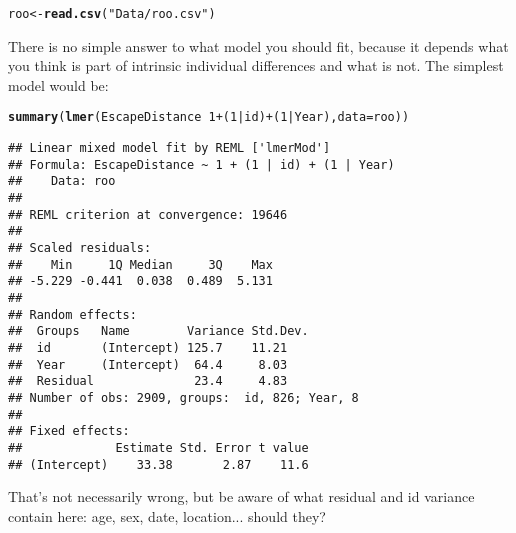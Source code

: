 \documentclass[12pt,a4paper]{scrartcl}\usepackage[]{graphicx}\usepackage[]{color}
\makeatletter
\newcommand{\hlnum}[1]{\textcolor[rgb]{0.686,0.059,0.569}{#1}}%
\newcommand{\hlstr}[1]{\textcolor[rgb]{0.192,0.494,0.8}{#1}}%
\newcommand{\hlopt}[1]{\textcolor[rgb]{0,0,0}{#1}}%
\newcommand{\hlstd}[1]{\textcolor[rgb]{0.345,0.345,0.345}{#1}}%
\newcommand{\hlkwb}[1]{\textcolor[rgb]{0.69,0.353,0.396}{#1}}%
\newcommand{\hlkwc}[1]{\textcolor[rgb]{0.333,0.667,0.333}{#1}}%
\newcommand{\hlkwd}[1]{\textcolor[rgb]{0.737,0.353,0.396}{\textbf{#1}}}%
\newenvironment{kframe}{%
 \def\at@end@of@kframe{}%
 \ifinner\ifhmode%
  \def\at@end@of@kframe{\end{minipage}}%
  \begin{minipage}{\columnwidth}%
 \fi\fi%
 \def\FrameCommand##1{\hskip\@totalleftmargin \hskip-\fboxsep
 \colorbox{shadecolor}{##1}\hskip-\fboxsep
     \hskip-\linewidth \hskip-\@totalleftmargin \hskip\columnwidth}%
 \MakeFramed {\advance\hsize-\width
   \@totalleftmargin\z@ \linewidth\hsize
   \@setminipage}}%
 {\par\unskip\endMakeFramed%
 \at@end@of@kframe}
\newenvironment{knitrout}{}{} %
\makeatother
\begin{document}
\begin{Answer}
\begin{knitrout}
\color{fgcolor}\begin{kframe}
\begin{alltt}
\hlstd{roo} \hlkwb{<-} \hlkwd{read.csv}\hlstd{(}\hlstr{"Data/roo.csv"}\hlstd{)}
\end{alltt}
\end{kframe}
\end{knitrout}

There is no simple answer to what model you should fit, because it depends what you think is part of intrinsic individual differences and what is not. The simplest model would be:
\begin{knitrout}
\color{fgcolor}\begin{kframe}
\begin{alltt}
\hlkwd{summary}\hlstd{(}\hlkwd{lmer}\hlstd{(EscapeDistance} \hlopt{~} \hlnum{1} \hlopt{+} \hlstd{(}\hlnum{1}\hlopt{|}\hlstd{id)} \hlopt{+} \hlstd{(}\hlnum{1}\hlopt{|}\hlstd{Year),} \hlkwc{data}\hlstd{=roo))}
\end{alltt}
\begin{verbatim}
## Linear mixed model fit by REML ['lmerMod']
## Formula: EscapeDistance ~ 1 + (1 | id) + (1 | Year)
##    Data: roo
## 
## REML criterion at convergence: 19646
## 
## Scaled residuals: 
##    Min     1Q Median     3Q    Max 
## -5.229 -0.441  0.038  0.489  5.131 
## 
## Random effects:
##  Groups   Name        Variance Std.Dev.
##  id       (Intercept) 125.7    11.21   
##  Year     (Intercept)  64.4     8.03   
##  Residual              23.4     4.83   
## Number of obs: 2909, groups:  id, 826; Year, 8
## 
## Fixed effects:
##             Estimate Std. Error t value
## (Intercept)    33.38       2.87    11.6
\end{verbatim}
\end{kframe}
\end{knitrout}
That's not necessarily wrong, but be aware of what residual and id variance contain here: age, sex, date, location... should they?


\end{Answer}
\end{document}
